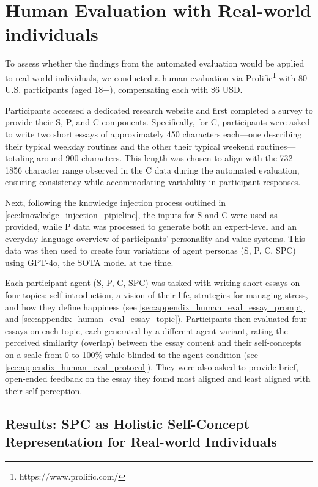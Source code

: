 \section{Human Evaluation with Real-world individuals}
To assess whether the findings from the automated evaluation would be applied to real-world individuals, we conducted a human evaluation via Prolific\footnote{https://www.prolific.com/} with 80 U.S. participants (aged 18+), compensating each with \$6 USD.

Participants accessed a dedicated research website and first completed a survey to provide their S, P, and C components. Specifically, for C, participants were asked to write two short essays of approximately 450 characters each—one describing their typical weekday routines and the other their typical weekend routines—totaling around 900 characters. This length was chosen to align with the 732–1856 character range observed in the C data during the automated evaluation, ensuring consistency while accommodating variability in participant responses.

Next, following the knowledge injection process outlined in \ref{sec:knowledge_injection_pipieline}, the inputs for S and C were used as provided, while P data was processed to generate both an expert-level and an everyday-language overview of participants' personality and value systems. 
This data was then used to create four variations of agent personas (S, P, C, SPC) using GPT-4o, the SOTA model at the time.

Each participant agent (S, P, C, SPC) was tasked with writing short essays on four topics: self-introduction, a vision of their life, strategies for managing stress, and how they define happiness (see \ref{sec:appendix_human_eval_essay_prompt} and \ref{sec:appendix_human_eval_essay_topic}). Participants then evaluated four essays on each topic, each generated by a different agent variant, rating the perceived similarity (overlap) between the essay content and their self-concepts on a scale from 0 to 100\%  while blinded to the agent condition (see \ref{sec:appendix_human_eval_protocol}). They were also asked to provide brief, open-ended feedback on the essay they found most aligned and least aligned with their self-perception.


\subsection{Results: SPC as Holistic Self-Concept Representation for Real-world Individuals}

